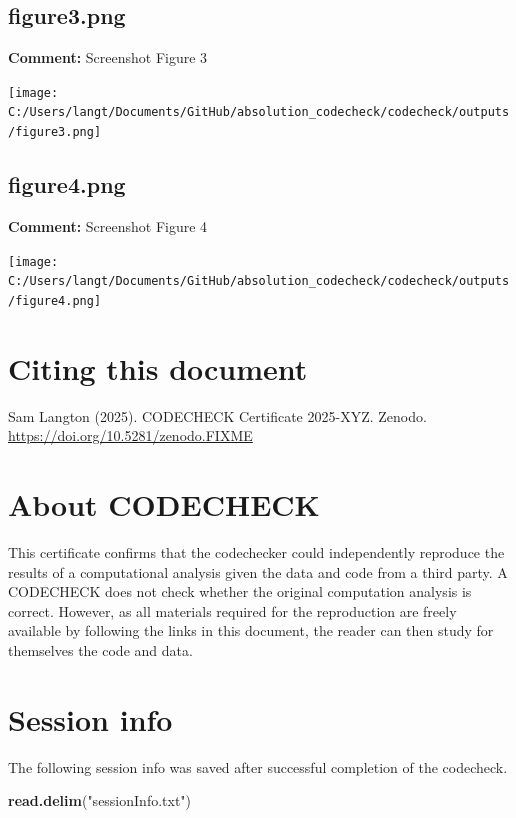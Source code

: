 \documentclass[
]{article}
\newenvironment{Shaded}{\begin{snugshade}}{\end{snugshade}}
\newcommand{\FunctionTok}[1]{\textcolor[rgb]{0.13,0.29,0.53}{\textbf{#1}}}
\newcommand{\NormalTok}[1]{#1}
\newcommand{\StringTok}[1]{\textcolor[rgb]{0.31,0.60,0.02}{#1}}
\begin{document}
\subsection{figure3.png}\label{figure3.png}

\textbf{Comment:} Screenshot Figure 3

\texttt{[image: C:/Users/langt/Documents/GitHub/absolution\_codecheck/codecheck/outputs/figure3.png]}
\clearpage 

\subsection{figure4.png}\label{figure4.png}

\textbf{Comment:} Screenshot Figure 4

\texttt{[image: C:/Users/langt/Documents/GitHub/absolution\_codecheck/codecheck/outputs/figure4.png]}
\clearpage 

\clearpage

\section{Citing this document}\label{citing-this-document}

Sam Langton (2025). CODECHECK Certificate 2025-XYZ. Zenodo.
\url{https://doi.org/10.5281/zenodo.FIXME}

\section{About CODECHECK}\label{about-codecheck}

This certificate confirms that the codechecker could independently
reproduce the results of a computational analysis given the data and
code from a third party. A CODECHECK does not check whether the original
computation analysis is correct. However, as all materials required for
the reproduction are freely available by following the links in this
document, the reader can then study for themselves the code and data.

\section{Session info}\label{session-info}

The following session info was saved after successful completion of the
codecheck.

\begin{Shaded}
\begin{Highlighting}[]
\FunctionTok{read.delim}\NormalTok{(}\StringTok{"sessionInfo.txt"}\NormalTok{)}
\end{Highlighting}
\end{Shaded}
\end{document}
